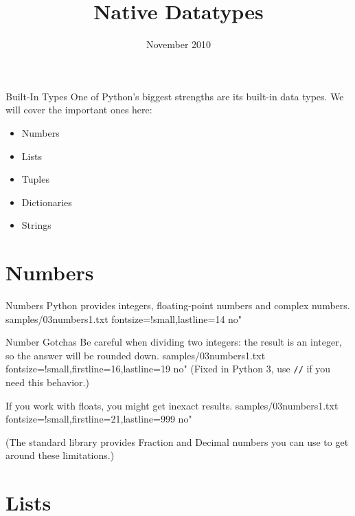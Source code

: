 \documentclass[reference]{pyslides}
\title{Native Datatypes}
\date{November 2010}
\begin{document}
\begin{frame}\titlepage\end{frame}

\section{}

\begin{frame}[fragile]{Built-In Types}
One of Python's biggest strengths are its built-in data types. We will cover the important ones here:
\begin{itemize}
\item Numbers
\item Lists
\item Tuples
\item Dictionaries
\item Strings
\end{itemize}
\end{frame}

\section{Numbers}

\begin{frame}[fragile]{Numbers}
Python provides integers, floating-point numbers and complex numbers.
 samples/03numbers1.txt fontsize=!small,lastline=14 no"
\end{frame}

\begin{frame}[fragile]{Number Gotchas}
Be careful when dividing two integers: the result is an integer, so the answer will be rounded down.
 samples/03numbers1.txt fontsize=!small,firstline=16,lastline=19 no"
(Fixed in Python 3, use \verb+//+ if you need this behavior.)

\bigskip

If you work with floats, you might get inexact results.
 samples/03numbers1.txt fontsize=!small,firstline=21,lastline=999 no"

\bigskip

{\small (The standard library provides Fraction and Decimal numbers you can use to get around these limitations.)}
\end{frame}

\section{Lists}
\end{document}
